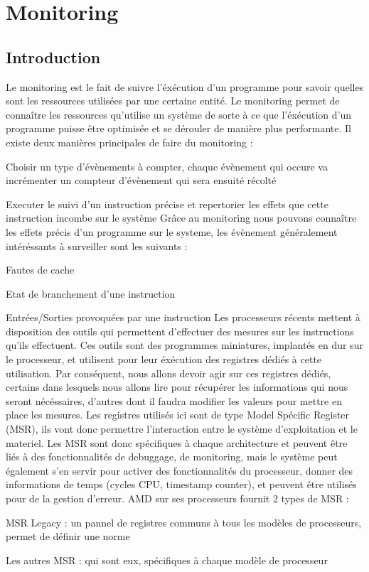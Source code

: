 \chapter{Monitoring}
	\section{Introduction}
		Le monitoring est le fait de suivre l'éxécution d'un programme pour savoir quelles sont les ressources utilisées par une certaine entité. Le monitoring permet de connaître les ressources qu'utilise un système de sorte à ce que l'éxécution d'un programme puisse être optimisée et se dérouler de manière plus performante. Il existe deux manières principales de faire du monitoring : 
		\benum
			\item{Choisir un type d'évènements à compter, chaque évènement qui occure va incrémenter un compteur d'évènement qui sera ensuité récolté}
			\item{Executer le suivi d'un instruction précise et repertorier les effets que cette instruction incombe sur le système}
		\eenum
		Grâce au monitoring nous pouvons connaître les effets précis d'un programme sur le systeme, les évènement généralement intéréssants à surveiller sont les suivants :
		\benum
			\item{Fautes de cache}
			\item{Etat de branchement d'une instruction}
			\item{Entrées/Sorties provoquées par une instruction}
		\eenum
		Les processeurs récents mettent à disposition des outils qui permettent d'effectuer des mesures sur les instructions qu'ils effectuent. Ces outils sont des programmes miniatures, implantés en dur sur le processeur, et utilisent pour leur éxécution des registres dédiés à cette utilisation. Par conséquent, nous allons devoir agir sur ces registres dédiés, certains dans lesquels nous allons lire pour récupérer les informations qui nous seront nécéssaires, d'autres dont il faudra modifier les valeurs pour mettre en place les mesures. Les registres utilisés ici sont de type Model Spécific Register (MSR), ils vont donc permettre l'interaction entre le système d'exploitation et le materiel. Les MSR sont donc spécifiques à chaque architecture et peuvent être liés à des fonctionnalités de debuggage, de monitoring, mais le système peut également s'en servir pour activer des fonctionnalités du processeur, donner des informations de temps (cycles CPU, timestamp counter), et peuvent être utilisés pour de la gestion d'erreur. AMD sur ses processeurs fournit 2 types de MSR : 
		\benum
			\item{MSR Legacy : un pannel de registres communs à tous les modèles de processeurs, permet de définir une norme}
			\item{Les autres MSR : qui sont eux, spécifiques à chaque modèle de processeur}
		\eenum
